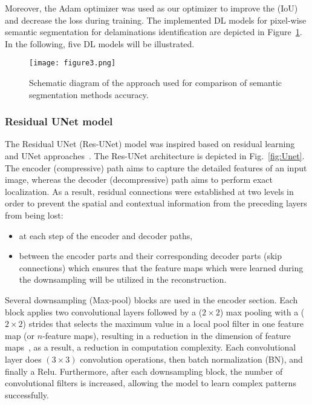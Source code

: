 Moreover, the Adam optimizer was used as our optimizer to improve the (IoU) and decrease the loss during training.
The implemented DL models for pixel-wise semantic segmentation for delaminations identification are depicted in Figure~\ref{fig:flowchart}.
In the following, five DL models will be illustrated.
\begin{figure} [h!]
	\begin{center}
		\texttt{[image: figure3.png]}
	\end{center}
	\caption{Schematic diagram of the approach used for comparison of semantic segmentation methods accuracy.} 
	\label{fig:flowchart}
\end{figure}
\subsubsection{Residual UNet model}
The Residual UNet (Res-UNet) model was inspired based on residual learning~\cite{He2016} and UNet approaches~\cite{Ronneberger2015}.
The Res-UNet architecture is depicted in Fig.~\ref{fig:Unet}.
The encoder (compressive) path aims to capture the detailed features of an input image, whereas the decoder (decompressive) path aims to perform exact localization.
As a result, residual connections were established at two levels in order to prevent the spatial and contextual information from the preceding layers from being lost:
\begin{itemize}
	\item at each step of the encoder and decoder paths,
	\item between the encoder parts and their corresponding decoder parts (skip connections) which ensures that the feature maps which were learned during the downsampling will be utilized in the reconstruction. 
\end{itemize}

Several downsampling (Max-pool) blocks are used in the encoder section.
Each block applies two convolutional layers followed by a (\(2\times2\)) max pooling with a (\(2\times2\)) strides that selects the maximum value in a local pool filter in one feature map (or \(n\)-feature maps), resulting in a reduction in the dimension of feature maps~\cite{Lecun2015}, as a result, a reduction in computation complexity.
Each convolutional layer does \((3\times3)\) convolution operations, then batch normalization (BN), and finally a Relu.
Furthermore, after each downsampling block, the number of convolutional filters is increased, allowing the model to learn complex patterns successfully.

